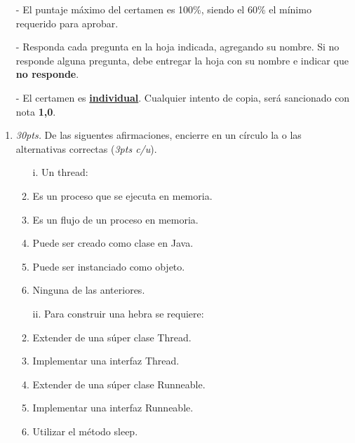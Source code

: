\documentclass[10pt]{article}
\begin{document}
{\scriptsize
\begin{itemize}
    \item[-] El puntaje m\'aximo del certamen es 100\%, siendo el 60\% el m\'inimo requerido para aprobar.
    \item[-] Responda cada pregunta en la hoja indicada, agregando su nombre. Si no responde alguna pregunta, debe entregar la hoja con su nombre e indicar que \textbf{no responde}.
    \item[-] El certamen es \underline{\textbf{individual}}. Cualquier intento de copia, ser\'a sancionado con nota \textbf{1,0}.
\end{itemize}
\vspace*{10pt}

\vspace*{-30pt}

\begin{enumerate}

    \item \emph{30pts.} De las siguentes afirmaciones, encierre en un c\'irculo la o las alternativas correctas (\emph{3pts c/u}).
    \begin{multicols}{2}

    \begin{enumerate}[label=(\alph*)]
        \item[i.] Un thread: 
        \item Es un proceso que se ejecuta en memoria.
        \item Es un flujo de un proceso en memoria.
        \item Puede ser creado como clase en Java.
        \item Puede ser instanciado como objeto.
        \item Ninguna de las anteriores.
    \end{enumerate}

    \begin{enumerate}[label=(\alph*)]
        \item[ii.] Para construir una hebra se requiere:
        \item Extender de una s\'uper clase Thread.
        \item Implementar una interfaz Thread.
        \item Extender de una s\'uper clase Runneable.
        \item Implementar una interfaz Runneable.
        \item Utilizar el m\'etodo sleep. 
    \end{enumerate}


\end{multicols}
\end{enumerate}}
\end{document}
